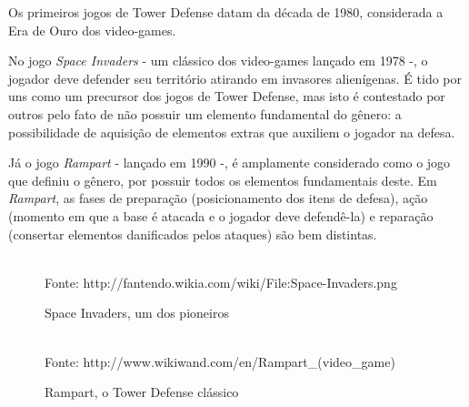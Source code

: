 \documentclass[rel_mlp]{iiufrgs}
\newcommand{\fonte}[1]{\\Fonte: {#1}}
\begin{document}
Os primeiros jogos de Tower Defense datam da década de 1980, considerada a Era de Ouro dos video-games.

No jogo \textit{Space Invaders} - um clássico dos video-games lançado em 1978 -, o jogador deve defender seu território atirando em invasores alienígenas. É tido por uns como um precursor dos jogos de Tower Defense, mas isto é contestado por outros pelo fato de não possuir um elemento fundamental do gênero: a possibilidade de aquisição de elementos extras que auxiliem o jogador na defesa.

Já o jogo \textit{Rampart} - lançado em 1990 -, é amplamente considerado como o jogo que definiu o gênero, por possuir todos os elementos fundamentais deste. Em \textit{Rampart}, as fases de preparação (posicionamento dos itens de defesa), ação (momento em que a base é atacada e o jogador deve defendê-la) e reparação (consertar elementos danificados pelos ataques) são bem distintas. \cite{tower_defense}

\begin{figure}[htb]
    \centering
    \caption{Space Invaders, um dos pioneiros}
    \label{fig:figura1}
    \fonte{http://fantendo.wikia.com/wiki/File:Space-Invaders.png}
\end{figure}

\begin{figure}[htb]
    \centering
    \caption{Rampart, o Tower Defense clássico}
    \label{fig:figura2}
    \fonte{http://www.wikiwand.com/en/Rampart\_(video\_game)}
\end{figure}
\end{document}
